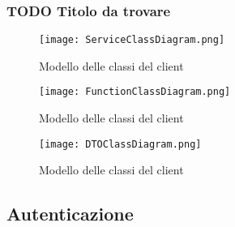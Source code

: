 \subsubsection{TODO Titolo da trovare}



\begin{figure}[h!]
    \begin{center}
        \texttt{[image: ServiceClassDiagram.png]}
        \caption{Modello delle classi del client}
    \end{center}
\end{figure}

\begin{figure}[h!]
    \begin{center}
        \texttt{[image: FunctionClassDiagram.png]}
        \caption{Modello delle classi del client}
    \end{center}
\end{figure}

\begin{figure}[h!]
    \begin{center}
        \texttt{[image: DTOClassDiagram.png]}
        \caption{Modello delle classi del client}
    \end{center}
\end{figure}
\clearpage




\subsection{Autenticazione}


